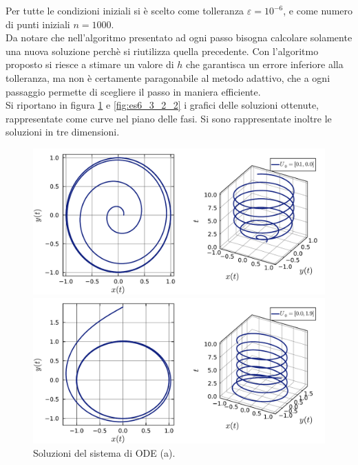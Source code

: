 \documentclass[letterpaper, 12pt]{article}
\numberwithin{equation}{section}    %
\begin{document}
Per tutte le condizioni iniziali si è scelto come tolleranza $\varepsilon = 10^{-6}$, e come numero di punti iniziali
$n = 1000$. \\
Da notare che nell'algoritmo presentato ad ogni passo bisogna calcolare solamente una nuova soluzione perchè si 
riutilizza quella precedente. Con l'algoritmo proposto si riesce a stimare un valore di $h$ che garantisca
un errore inferiore alla tolleranza, ma non è certamente paragonabile al metodo adattivo, che a ogni passaggio
permette di scegliere il passo in maniera efficiente. \\
Si riportano in figura \ref{fig:es6_3_2_1} e \ref{fig:es6_3_2_2} i grafici delle soluzioni ottenute,
rappresentate come curve nel piano delle fasi. Si sono rappresentate inoltre le 
soluzioni in tre dimensioni.
\begin{figure}[!ht]
    \centering
    \begin{minipage}[b]{0.47\textwidth}
        \includegraphics[width=\textwidth]{632A1.pdf}
    \end{minipage}
    \hspace{0.5cm}
    \begin{minipage}[b]{0.47\textwidth}
        \includegraphics[width=\textwidth]{632A2.pdf}
    \end{minipage}
    \caption{Soluzioni del sistema di ODE (a).}
    \label{fig:es6_3_2_1}
\end{figure}
\end{document}
